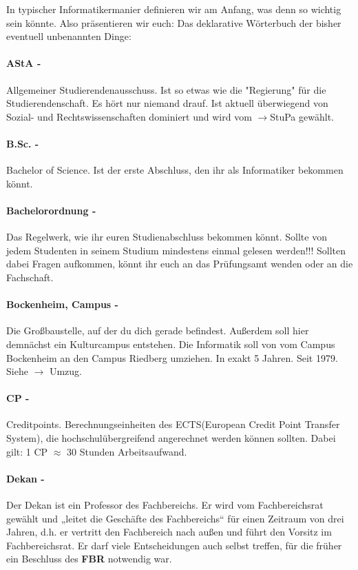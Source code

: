 In typischer Informatikermanier definieren wir am Anfang, was denn so wichtig sein k\"onnte. Also pr\"asentieren wir euch: Das deklarative W\"orterbuch der bisher eventuell unbenannten Dinge:
\spaltenanfang
\paragraph{AStA -} \glqq Allgemeiner Studierendenausschuss\grqq . Ist so etwas wie die "Regierung" für die Studierendenschaft. Es hört nur niemand drauf. Ist aktuell überwiegend von Sozial- und Rechtswissenschaften dominiert und wird vom $ \rightarrow $StuPa gewählt.  
\paragraph{B.Sc. -}\glqq Bachelor of Science\grqq . Ist der erste Abschluss, den ihr als Informatiker bekommen könnt.
\paragraph{Bachelorordnung -} Das Regelwerk, wie ihr euren Studienabschluss bekommen könnt. Sollte von jedem Studenten in seinem Studium mindestens einmal gelesen werden!!! Sollten dabei Fragen aufkommen, könnt ihr euch an das Prüfungsamt wenden oder an die Fachschaft.
\paragraph{Bockenheim, Campus -} Die Großbaustelle, auf der du dich gerade befindest. Außerdem soll hier demnächst ein Kulturcampus entstehen. Die Informatik soll von vom Campus Bockenheim an den Campus Riedberg umziehen. In exakt 5 Jahren. Seit 1979. Siehe $ \rightarrow $ Umzug.
\paragraph{CP -} \glqq Creditpoints\grqq . Berechnungseinheiten des ECTS(European Credit Point Transfer System), die hochschulübergreifend angerechnet werden können sollten. Dabei gilt: 1 CP $\approx$ 30 Stunden Arbeitsaufwand.
\paragraph{Dekan -} Der Dekan ist ein Professor des Fachbereichs. Er wird vom Fachbereichsrat gewählt und „leitet die Geschäfte des Fachbereichs“ für einen Zeitraum von drei Jahren, d.h. er vertritt den Fachbereich nach außen und führt den Vorsitz im Fachbereichsrat. Er darf viele Entscheidungen auch selbst treffen, für die früher ein Beschluss des \textbf{FBR} notwendig war.
